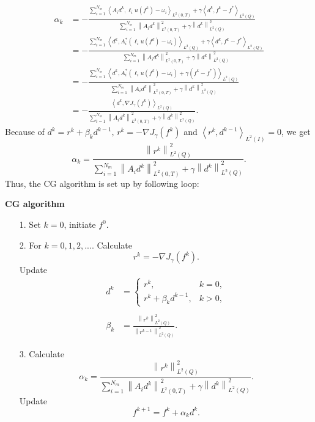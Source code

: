 \documentclass[]{article}
\begin{document}
\begin{align*}
	\alpha_k&=-\frac{\displaystyle\sum_{i=1}^{N_m}\left\langle A_id^k, \ell_i u(f^k)-\omega_i\right\rangle_{L^2(0, T)}+\gamma\left\langle d^k, f^k-f^*\right\rangle_{L^2(Q)}}{\displaystyle\sum_{i=1}^{N_m}\left\|A_id^k\right\|^2_{L^2(0, T)}+\gamma\left\|d^k\right\|^2_{L^2(Q)}}\\[0.2cm]
	&=-\frac{\displaystyle\sum_{i=1}^{N_m}\left\langle d^k, A_i^*\left(\ell_i u(f^k)-\omega_i\right)\right\rangle_{L^2(Q)}+\gamma\left\langle d^k, f^k-f^*\right\rangle_{L^2(Q)}}{\displaystyle\sum_{i=1}^{N_m}\left\|A_id^k\right\|^2_{L^2(0, T)}+\gamma\left\|d^k\right\|^2_{L^2(Q)}}\\[0.2cm]
	&=-\frac{\displaystyle\sum_{i=1}^{N_m}\left\langle d^k, A_i^*\left(\ell_i u(f^k)-\omega_i\right)+\gamma(f^k-f^*)\right\rangle_{L^2(Q)}}{\displaystyle\sum_{i=1}^{N_m}\left\|A_id^k\right\|^2_{L^2(0, T)}+\gamma\left\|d^k\right\|^2_{L^2(Q)}}\\[0.2cm]
	&=-\frac{\left\langle d^k,\nabla J_\gamma(f^k)\right\rangle_{L^2(Q)}}{\displaystyle\sum_{i=1}^{N_m}\left\|A_id^k\right\|^2_{L^2(0, T)}+\gamma\left\|d^k\right\|^2_{L^2(Q)}}.
\end{align*}
Because of $d^k=r^k+\beta_kd^{k-1},\, r^k=-\nabla J_\gamma (f^k)$ and $\left\langle r^k,d^{k-1}\right\rangle_{L^2(I)}=0$, we get 
$$\alpha_k=\frac{\left\|r^k\right\|^2_{L^2(Q)}}{\displaystyle\sum_{i=1}^{N_m}\left\|A_id^k\right\|^2_{L^2(0, T)}+\gamma\left\|d^k\right\|^2_{L^2(Q)}}.$$
Thus, the CG algorithm is set up by following loop:

\noindent \textbf{CG algorithm}
\begin{itemize}
	\item[1.] Set $k=0$, initiate $f^0$.
	\item[2.] For $k=0, 1, 2,...$. Calculate
	$$r^k=-\nabla J_\gamma(f^k).$$
	Update\\
	\begin{align*}
		d^k&=\left\{\begin{array}{ll}
		r^k,& k=0,\\
		r^k+\beta_kd^{k-1},& k>0,
		\end{array}\right.\\\\
		\beta_k&=\frac{\left\|r^k\right\|^2_{L^2(Q)}}{\left\|r^{k-1}\right\|^2_{L^2(Q)}}.
	\end{align*}
	\item[3.] Calculate
	$$\alpha_k=\frac{\left\|r^k\right\|^2_{L^2(Q)}}{\displaystyle\sum_{i=1}^{N_m}\left\|A_id^k\right\|^2_{L^2(0, T)}+\gamma\left\|d^k\right\|^2_{L^2(Q)}}.$$
	Update
	$$f^{k+1}=f^{k}+\alpha_kd^k.$$
\end{itemize}
\end{document}
